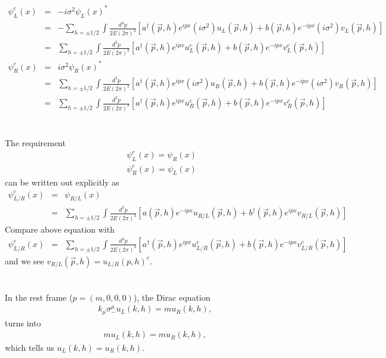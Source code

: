\documentclass[11pt]{article}
\begin{document}
\section{ }
\begin{eqnarray}
    \psi_L^c(x) &=& -i\sigma^2 \psi_L(x)^*\\
    &=& -\sum_{h=\pm1/2} \int \frac{d^3p}{2E(2\pi)^3}
    [a^\dagger ({\vec p},h) e^{ipx} (i\sigma^2)u_L({\vec p},h) +b({\vec p},h) e^{-ipx} (i\sigma^2)v_L({\vec p},h)] \\ 
    &=&\sum_{h=\pm1/2} \int \frac{d^3p}{2E(2\pi)^3}
    [a^\dagger({\vec p},h) e^{ipx} u_L^c({\vec p},h) +b({\vec p},h) e^{-ipx} v_L^c({\vec p},h)]\\
    \psi_R^c(x)&=& i\sigma^2 \psi_R(x)^* \\
    &=& \sum_{h=\pm1/2} \int \frac{d^3p}{2E(2\pi)^3}
    [a^\dagger ({\vec p},h) e^{ipx} (i\sigma^2)u_R({\vec p},h) +b({\vec p},h) e^{-ipx}(i\sigma^2)v_R({\vec p},h)]\\
    &=& \sum_{h=\pm1/2} \int \frac{d^3p}{2E(2\pi)^3}
    [a^\dagger({\vec p},h) e^{ipx} u_R^c({\vec p},h) +b({\vec p},h) e^{-ipx} v_R^c({\vec p},h)]
\end{eqnarray}

\section{ }
The requirement
\begin{eqnarray}
    && \psi_L^c(x) = \psi_R(x) \\
    && \psi_R^c(x) = \psi_L(x) 
\end{eqnarray}
can be written out explicitly as 
\begin{eqnarray}
    \psi_{L/R}^c(x)&=&\psi_{R/L}(x) \\
    &=& \sum_{h=\pm1/2} \int \frac{d^3p}{2E(2\pi)^3}
    [a ({\vec p},h) e^{-ipx} u_{R/L}({\vec p},h) +b^\dagger ({\vec p},h) e^{ipx}v_{R/L}({\vec p},h)]
\end{eqnarray}
Compare above equation with
\begin{eqnarray}
    \psi_{L/R}^c(x)&=& \sum_{h=\pm1/2} \int \frac{d^3p}{2E(2\pi)^3}
    [a^\dagger({\vec p},h) e^{ipx} u_{L/R}^c({\vec p},h) +b({\vec p},h) e^{-ipx} v_{L/R}^c({\vec p},h)]
\end{eqnarray}
and we see
$v_{R/L}({\vec p},h) = u_{L/R}(p,h)^c$.

\section{ }
In the rest frame ($p=(m,0,0,0)$), the Dirac equation
\begin{eqnarray}
    k_\mu \sigma_-^\mu u_L(k,h) = m u_R(k,h),
\end{eqnarray}
turns into
\begin{eqnarray}
    m u_L(k,h)=m u_R(k,h),
\end{eqnarray}
which tells us $u_L(k,h)=u_R(k,h)$.
\end{document}
